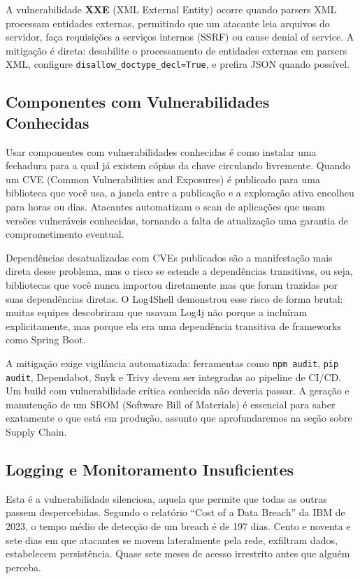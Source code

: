 A vulnerabilidade \textbf{XXE} (XML External Entity) ocorre quando parsers XML
processam entidades externas, permitindo que um atacante leia arquivos do
servidor, faça requisições a serviços internos (SSRF) ou cause denial of service.
A mitigação é direta: desabilite o processamento de entidades externas em
parsers XML, configure \texttt{disallow\_doctype\_decl=True}, e prefira JSON
quando possível.

\subsection{Componentes com Vulnerabilidades Conhecidas}

Usar componentes com vulnerabilidades conhecidas é como instalar uma fechadura
para a qual já existem cópias da chave circulando livremente. Quando um CVE
(Common Vulnerabilities and Exposures) é publicado para uma biblioteca que você
usa, a janela entre a publicação e a exploração ativa encolheu para horas ou dias.
Atacantes automatizam o scan de aplicações que usam versões vulneráveis
conhecidas, tornando a falta de atualização uma garantia de comprometimento
eventual.

Dependências desatualizadas com CVEs publicados são a manifestação mais direta
desse problema, mas o risco se estende a dependências transitivas, ou seja,
bibliotecas que você nunca importou diretamente mas que foram trazidas por suas
dependências diretas. O Log4Shell demonstrou esse risco de forma brutal: muitas
equipes descobriram que usavam Log4j não porque a incluíram explicitamente, mas
porque ela era uma dependência transitiva de frameworks como Spring Boot.

A mitigação exige vigilância automatizada: ferramentas como \texttt{npm audit},
\texttt{pip audit}, Dependabot, Snyk e Trivy devem ser integradas ao pipeline de
CI/CD. Um build com vulnerabilidade crítica conhecida não deveria passar. A
geração e manutenção de um SBOM (Software Bill of Materials) é essencial para
saber exatamente o que está em produção, assunto que aprofundaremos na seção sobre
Supply Chain.

\subsection{Logging e Monitoramento Insuficientes}

Esta é a vulnerabilidade silenciosa, aquela que permite que todas as outras passem
despercebidas. Segundo o relatório ``Cost of a Data Breach'' da IBM de 2023, o
tempo médio de detecção de um breach é de 197 dias. Cento e noventa e sete dias
em que atacantes se movem lateralmente pela rede, exfiltram dados, estabelecem
persistência. Quase sete meses de acesso irrestrito antes que alguém perceba.

